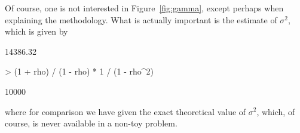 \documentclass{article}
\begin{document}
Of course, one is not interested in Figure~\ref{fig:gamma}, except
perhaps when explaining the methodology.  What is actually important
is the estimate of $\sigma^2$, which is given by
\begin{Schunk}
\begin{Soutput}
[1] 14386.32
\end{Soutput}
\begin{Sinput}
> (1 + rho) / (1 - rho) * 1 / (1 - rho^2)
\end{Sinput}
\begin{Soutput}
[1] 10000
\end{Soutput}
\end{Schunk}
where for comparison we have given the exact theoretical value of $\sigma^2$,
which, of course, is never available in a non-toy problem.
\end{document}
